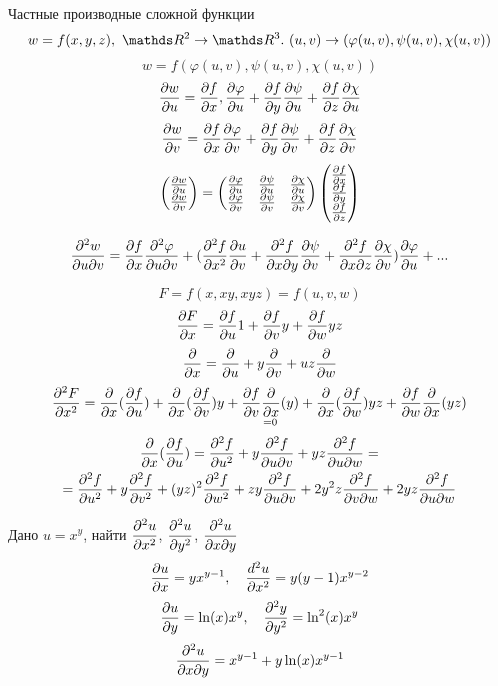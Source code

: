 \documentclass[12pt, fleqn]{article}
\begin{document}
Частные производные сложной функции 
\[w=f(x,y,z),\ \R^2 \ra \R^3.\ (u,v) \ra(\varphi(u,v), \psi(u,v), \chi(u,v))\]
\[w=f(\varphi(u,v), \psi(u,v), \chi(u,v))\]
\[\frac{\partial w}{\partial u}=\frac{\partial f}{\partial x}, \frac{\partial \varphi}{\partial u}+ \frac{\partial f}{\partial y} \frac{\partial \psi}{\partial u}+\frac{\partial f}{\partial z} \frac{\partial \chi}{\partial u}\]
\[\frac{\partial w}{\partial v}=\frac{\partial f}{\partial x} \frac{\partial \varphi}{\partial v}+\frac{\partial f}{\partial y} \frac{\partial \psi}{\partial v}+ \frac{\partial f}{\partial z} \frac{\partial \chi}{\partial v}\]
\[
\begin{pmatrix}
\frac{\partial w}{\partial u}\\
\frac{\partial w}{\partial v}
\end{pmatrix}=
\begin{pmatrix}
\frac{\partial \varphi}{\partial u} & \frac{\partial \psi}{\partial u} & \frac{\partial \chi}{\partial u}\\
\frac{\partial \varphi}{\partial v} & \frac{\partial \psi}{\partial v} & \frac{\partial \chi}{\partial v}
\end{pmatrix}
\begin{pmatrix}
\frac{\partial f}{\partial x}\\
\frac{\partial f}{\partial y}\\
\frac{\partial f}{\partial z}
\end{pmatrix}
\]

\begin{example}
    \[\frac{\partial^2 w}{\partial u \partial v} = \frac{\partial f}{\partial x} \frac{\partial^2 \varphi}{\partial u \partial v}+(\frac{\partial^2 f}{\partial x^2} \frac{\partial u}{\partial v}+\frac{\partial^2 f}{\partial x \partial y} \frac{\partial \psi}{\partial v}+\frac{\partial^2 f}{\partial x \partial z} \frac{\partial \chi}{\partial v}) \frac{\partial \varphi}{\partial u}+...\]
\end{example}

\begin{example}
    \[F=f(x,x y, x y z)=f(u,v,w)\]
    \[\frac{\partial F}{\partial x}=\frac{\partial f}{\partial u} 1+ \frac{\partial f}{\partial v} y + \frac{\partial f}{\partial w} yz\]
    \[\frac{\partial}{\partial x}=\frac{\partial}{\partial u}+y \frac{\partial}{\partial v}+uz \frac{\partial}{\partial w}\]
    \[\frac{\partial^2 F}{\partial x^2} = \frac{\partial}{\partial x}(\frac{\partial f}{\partial u})+ \frac{\partial}{\partial x}(\frac{\partial f}{\partial v}) y + \underset{=0}{\frac{\partial f}{\partial v} \frac{\partial}{\partial x} (y)}+ \frac{\partial}{\partial x} (\frac{\partial f}{\partial w}) yz + \frac{\partial f}{\partial w} \frac{\partial}{\partial x} (yz)\]
    \begin{multline*}
        \frac{\partial}{\partial x} (\frac{\partial f}{\partial u})=\frac{\partial^2 f}{\partial u^2}+ y \frac{\partial^2 f}{\partial u \partial v}+yz \frac{\partial^2 f}{\partial u \partial w} =\\ = \frac{\partial^2 f}{\partial u^2}+y \frac{\partial^2 f}{\partial v^2}+(yz)^2 \frac{\partial^2 f}{\partial w^2}+z y \frac{\partial^2 f}{\partial u \partial v} + 2y^2 z \frac{\partial^2 f}{\partial v \partial w} + 2yz \frac{\partial^2 f}{\partial u \partial w}
    \end{multline*}
    
\end{example}

\begin{example}
    Дано $u=x^y$, найти $\dfrac{\partial^2 u}{\partial x^2}$, $\dfrac{\partial^2 u}{\partial y^2}$, $\dfrac{\partial^2 u}{\partial x \partial y}$
    \\
    \[\dfrac{\partial u}{\partial x}=y x^{y-1}, \quad \dfrac{d^2 u}{\partial x^2}=y(y-1)x^{y-2}\]
    \[\dfrac{\partial u}{\partial y}=\ln(x) x^y, \quad \dfrac{\partial^2 y}{\partial y^2}=\ln^2(x) x^y\]
    \[\dfrac{\partial^2 u}{\partial x \partial y}=x^{y-1}+y \ln(x) x^{y-1}\]
\end{example}
\end{document}
